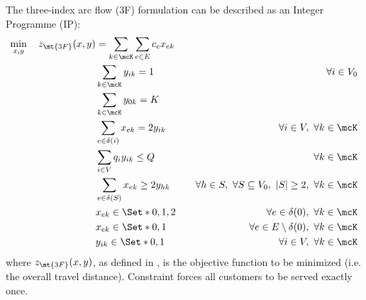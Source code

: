 The three-index arc flow (3F) formulation can be described as an Integer Programme (IP):
\begin{align}
	\min_{x, y} \quad z_\mt{3F}(x, y) & = \sum_{k \in \mcK} \sum_{e \in E} c_{e} x_{ek} & \label{eq:three-index-flow-obj-func}                                                                                    \\
	                                  & \sum_{k \in \mcK} y_{ik} = 1                    & \quad \forall i \in V_0 \label{eq:three-index-flow-all-customers-visited}                                               \\
	                                  & \sum_{k \in \mcK} y_{0k} = K                    & \label{eq:three-index-flow-tour-starts-and-ends-at-depot}                                                               \\
	                                  & \sum_{e \in \delta(i)} x_{ek} = 2 y_{ik}        & \quad \forall i \in V,\ \forall k \in \mcK \label{eq:three-index-flow-force-visited-customer-if-flow}                   \\
	                                  & \sum_{i \in V} q_i y_{ik} \le Q                 & \quad \forall k \in \mcK \label{eq:three-index-flow-force-resource-upper-bound}                                         \\
	                                  & \sum_{e \in \delta(S)} x_{ek} \ge 2 y_{hk}      & \quad \forall h \in S,\ \forall S \subseteq V_0,\ |S| \ge 2,\ \forall k \in \mcK \label{eq:three-index-flow-secv1}      \\
	                                  & x_{ek}                   \in \Set*{0, 1, 2}     & \quad \forall e \in \delta(0),\ \forall k \in \mcK             \label{eq:three-index-flow-x-mip-var-bounds-depot}       \\
	                                  & x_{ek}                   \in \Set*{0, 1}        & \quad \forall e \in E \setminus \delta(0),\ \forall k \in \mcK             \label{eq:three-index-flow-x-mip-var-bounds} \\
	                                  & y_{ik}                    \in \Set*{0, 1}       & \quad \forall i \in V,\ \forall k \in \mcK  \label{eq:three-index-flow-y-mip-var-bounds}
\end{align}
where $z_\mt{3F}(x, y)$, as defined in , is the objective function to be minimized (i.e. the overall travel distance).
Constraint  forces all customers to be served exactly once.
